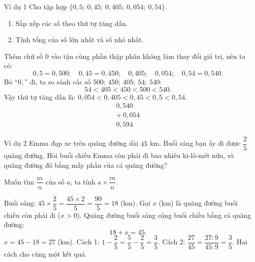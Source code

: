 \par\vspace{0.7em}\par\vspace{0.3em}

\begin{exbox}{Ví dụ 1}
Cho tập hợp $\{0{,}5;\ 0{,}45;\ 0{,}405;\ 0{,}054;\ 0{,}54\}$.
\begin{enumerate}[label=\alph*),leftmargin=1.6em,itemsep=0pt,topsep=2pt]
  \item Sắp xếp các số theo thứ tự tăng dần.
  \item Tính tổng của số lớn nhất và số nhỏ nhất.
\end{enumerate}
\guide
{}
Thêm chữ số $0$ vào tận cùng phần thập phân không làm thay đổi giá trị, nên ta có:
\[ 0{,}5 = 0{,}500;\quad 0{,}45 = 0{,}450;\quad 0{,}405;\quad 0{,}054;\quad 0{,}54 = 0{,}540. \]
Bỏ ``$0{,}$'' đi, ta so sánh các số $500;\ 450;\ 405;\ 54;\ 540$:
\[ 54 < 405 < 450 < 500 < 540. \]
Vậy thứ tự tăng dần là: $0{,}054 < 0{,}405 < 0{,}45 < 0{,}5 < 0{,}54$.
\[ \begin{array}{r} 0{,}540\\ +\ 0{,}054\\ \hline 0{,}594 \end{array} \]
\end{exbox}

\begin{exbox}{Ví dụ 2}
Emma đạp xe trên quãng đường dài $45$ km. Buổi sáng bạn ấy đi được $\dfrac{2}{5}$ quãng đường. Hỏi buổi chiều Emma
còn phải đi bao nhiêu ki-lô-mét nữa, và quãng đường đó bằng mấy phần của cả quãng đường?
\guide
{}
\begin{recallbox}Muốn tìm $\dfrac{m}{n}$ của số $a$, ta tính $a\times\dfrac{m}{n}$.\end{recallbox}
Buổi sáng: $45 \times \dfrac{2}{5} = \dfrac{45\times 2}{5} = \dfrac{90}{5} = 18$ (km).
Gọi $x$ (km) là quãng đường buổi chiều còn phải đi ($x > 0$). Quãng đường buổi sáng cộng buổi chiều bằng cả quãng đường:
\[ 18 + x = 45. \]
$x = 45 - 18 = 27$ (km).
Cách 1: $1 - \dfrac{2}{5} = \dfrac{5}{5} - \dfrac{2}{5} = \dfrac{3}{5}$.\quad
Cách 2: $\dfrac{27}{45} = \dfrac{27:9}{45:9} = \dfrac{3}{5}$. Hai cách cho cùng một kết quả.
\end{exbox}

